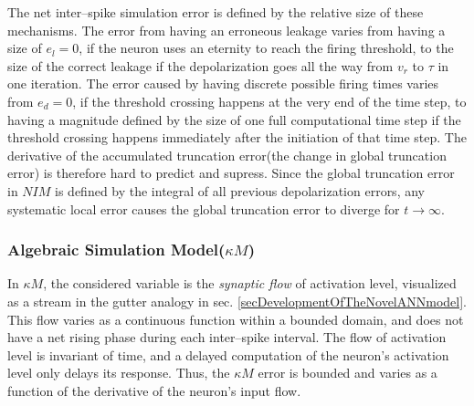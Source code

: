 		The net inter--spike simulation error is defined by the relative size of these mechanisms.
		The error from having an erroneous leakage varies from having a size of $e_l=0$, if the neuron uses an eternity to reach the firing threshold,
			 to the size of the correct leakage if the depolarization goes all the way from $v_r$ to $\tau$ in one iteration.
		The error caused by having discrete possible firing times varies from $e_d=0$, if the threshold crossing happens at the very end of the time step,
			to having a magnitude defined by the size of one full computational time step if the threshold crossing happens immediately after the initiation of that time step.
		The derivative of the accumulated truncation error(the change in global truncation error) is therefore hard to predict and supress. %
		Since the global truncation error in $NIM$ is defined by the integral of all previous depolarization errors, 
			any systematic local error causes the global truncation error to diverge for $t\to\infty$.
	



		\subsubsection{Algebraic Simulation Model($\kappa M$)} %

		In $\kappa M$, the considered variable is the \emph{synaptic flow} of activation level, visualized as a stream in the gutter analogy in sec. \ref{secDevelopmentOfTheNovelANNmodel}.
		This flow varies as a continuous function within a bounded domain, and does not have a net rising phase during each inter--spike interval.
		The flow of activation level is invariant of time, and a delayed computation of the neuron's activation level only delays its response.
		Thus, the $\kappa M$ error is bounded and varies as a function of the derivative of the neuron's input flow.


